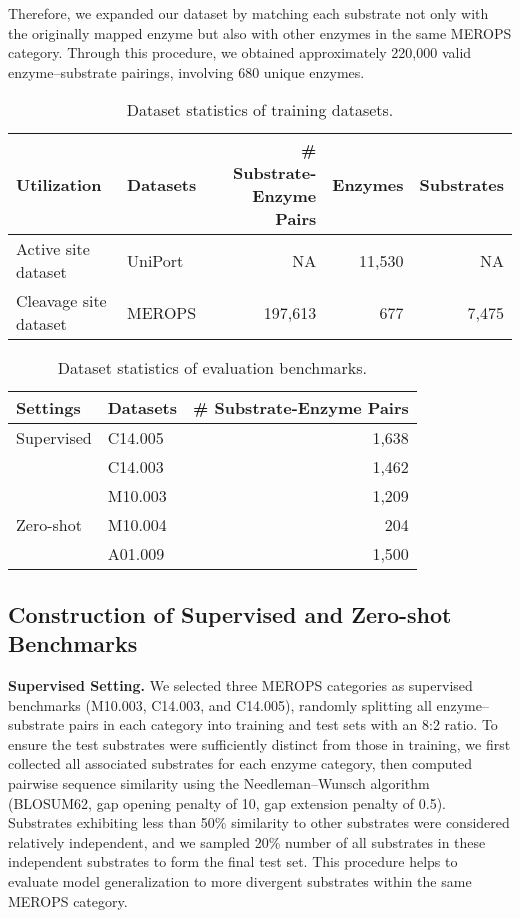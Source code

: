 Therefore, we expanded our dataset by matching each substrate not only with the originally mapped enzyme but also with other enzymes in the same MEROPS category. Through this procedure, we obtained approximately 220,000 valid enzyme–substrate pairings, involving 680 unique enzymes.

\begin{table}[t]
\small
\centering
\caption{Dataset statistics of training datasets.}
\label{table:dataset_statistics}
\begin{tabular}{llrrr}
\toprule
\textbf{Utilization} & \textbf{Datasets} & \textbf{\# Substrate-Enzyme Pairs}& \textbf{Enzymes}& \textbf{Substrates}\\ 
\midrule
Active site dataset          & UniPort          & NA& 11,530& NA\\ 
\midrule
 Cleavage site dataset & MEROPS& 197,613& 677& 7,475\\   
\bottomrule
\end{tabular}
\end{table}

\begin{table}[t]
\small
\centering
\caption{Dataset statistics of evaluation benchmarks.}
\label{table:dataset_statistics}
\begin{tabular}{llr}
\toprule
\textbf{Settings} & \textbf{Datasets} & \textbf{\# Substrate-Enzyme Pairs} \\
\midrule
Supervised& C14.005& 1,638\\ 
     & C14.003& 1,462\\ 
     & M10.003& 1,209\\ 
\midrule
Zero-shot& M10.004& 204\\ 
     & A01.009& 1,500\\
\bottomrule
\end{tabular}
\end{table}

\subsection{Construction of Supervised and Zero-shot Benchmarks}

\textbf{Supervised Setting.}
We selected three MEROPS categories as supervised benchmarks (M10.003, C14.003, and C14.005), randomly splitting all enzyme--substrate pairs in each category into training and test sets with an 8:2 ratio. To ensure the test substrates were sufficiently distinct from those in training, we first collected all associated substrates for each enzyme category, then computed pairwise sequence similarity using the Needleman--Wunsch algorithm (BLOSUM62, gap opening penalty of 10, gap extension penalty of 0.5). Substrates exhibiting less than 50\% similarity to other substrates were considered relatively independent, and we sampled 20\% number of all  substrates in these independent substrates to form the final test set. This procedure helps to evaluate model generalization to more divergent substrates within the same MEROPS category.

